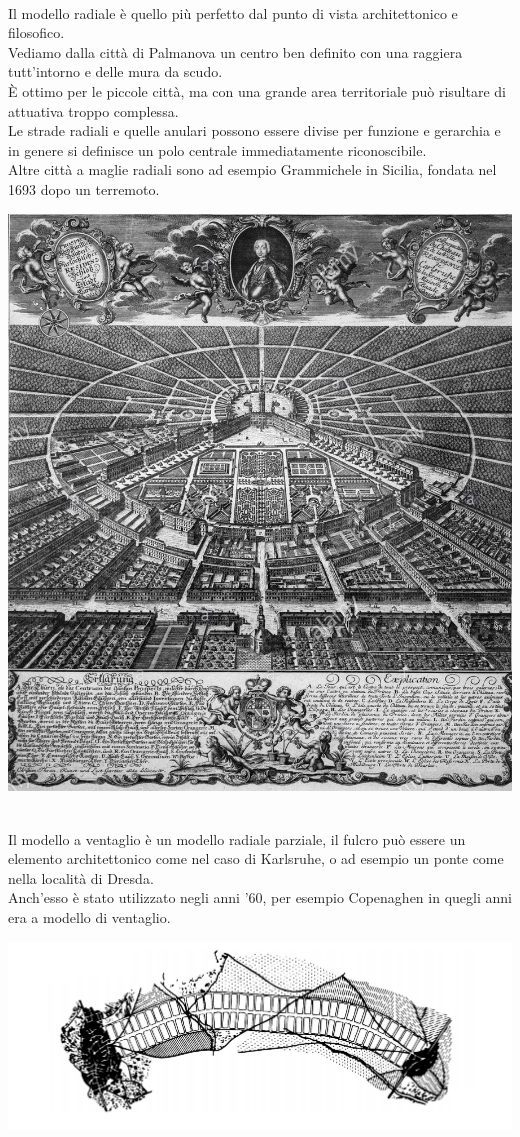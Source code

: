 \documentclass[a4paper,12pt, oneside]{book}
\begin{document}
  \leavevmode\\
  Il modello radiale è quello più perfetto dal punto di vista architettonico e filosofico.\\ Vediamo dalla città di Palmanova un centro ben definito con una raggiera tutt'intorno e delle mura da scudo.\\ È ottimo per le piccole città, ma con una grande area territoriale può risultare di attuativa troppo complessa.\\
  Le strade radiali e quelle anulari possono essere divise per funzione e gerarchia e in genere si definisce un polo centrale immediatamente riconoscibile.\\
  Altre città a maglie radiali sono ad esempio Grammichele in Sicilia, fondata nel 1693 dopo un terremoto.\\
  \begin{center}
  	\includegraphics[width=0.6\linewidth]{"immagini/karlsruhe 1739"}
  	\label{fig:karlsruhe 1739}
  \end{center}
  \leavevmode\\
  Il modello a ventaglio è un modello radiale parziale, il fulcro può essere un elemento architettonico come nel caso di Karlsruhe, o ad esempio un ponte come nella località di Dresda.\\
  Anch'esso è stato utilizzato negli anni '60, per esempio Copenaghen in quegli anni era a modello di ventaglio.\\
  \begin{center}
  	\includegraphics[width=0.5\linewidth]{"immagini/madrid sorya y mata"}
  	\label{fig:madrid sorya y mata}
  \end{center}
\end{document}
